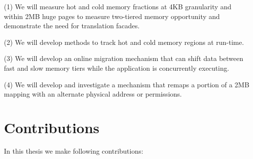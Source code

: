 (1) We will measure hot
and cold memory fractions at 4KB granularity and within 2MB huge pages to
measure two-tiered memory opportunity and demonstrate the need for translation
facades.

(2) We will develop methods to track hot and cold memory
regions at run-time. 

(3) We will develop an online migration mechanism that can shift
data between fast and slow memory tiers while the application is concurrently
executing.

(4) We will develop and investigate a mechanism that remaps a portion of a
2MB mapping with an alternate physical address or permissions.  

\section{Contributions}
In this thesis we make following contributions:

